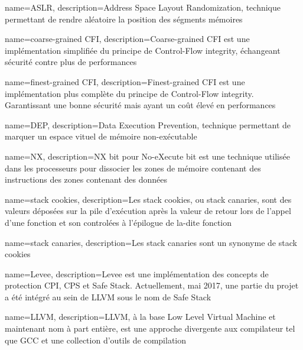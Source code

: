 


{
	name=ASLR,
	description={Address Space Layout Randomization, technique permettant de rendre aléatoire la position des ségments mémoires}
}

{
	name=coarse-grained CFI,
	description={Coarse-grained CFI est une implémentation simplifiée du principe de Control-Flow integrity, échangeant sécurité contre plus de performances}
}

{
	name=finest-grained CFI,
	description={Finest-grained CFI est une implémentation plus complète du principe de Control-Flow integrity. Garantissant une bonne sécurité mais ayant un coût élevé en performances}
}

{
	name=DEP,
	description={Data Execution Prevention, technique permettant de marquer un espace vituel de mémoire non-exécutable}
}

{
	name=NX,
	description={NX bit pour No-eXecute bit est une technique utilisée dans les processeurs pour dissocier les zones de mémoire contenant des instructions des zones contenant des données}
}

{
	name={stack cookies},
	description={Les stack cookies, ou stack canaries, sont des valeurs déposées sur la pile d'exécution après la valeur de retour lors de l'appel d'une fonction et son controlées à l'épilogue de la-dite fonction}
}

{
	name={stack canaries},
	description={Les stack canaries sont un synonyme de stack cookies}
}

{
	name={Levee},
	description={Levee est une implémentation des concepts de protection CPI, CPS et Safe Stack. Actuellement, mai 2017, une partie du projet a été intégré au sein de LLVM sous le nom de Safe Stack}
}

{
	name={LLVM},
	description={LLVM, à la base Low Level Virtual Machine et maintenant nom à part entière, est une approche divergente aux compilateur tel que GCC et une collection d'outils de compilation}
}

